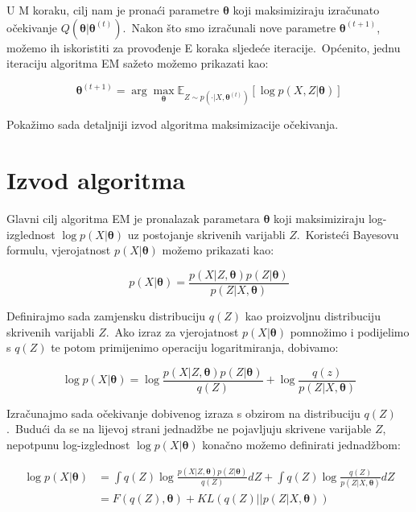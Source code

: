 \documentclass[diplomskirad]{fer}
\begin{document}
U M koraku, cilj nam je pronaći parametre $\bm{\theta}$ koji maksimiziraju izračunato očekivanje $Q (\bm{\theta} | \bm{\theta}^{(t)})$.\
Nakon što smo izračunali nove parametre $\bm{\theta}^{(t + 1)}$, možemo ih iskoristiti za provođenje E koraka sljedeće iteracije.\ 
Općenito, jednu iteraciju algoritma EM sažeto možemo prikazati kao:

\begin{equation}
  \bm{\theta}^{(t + 1)} = \arg \max_{\bm{\theta}} \mathbb{E}_{Z \sim p(\cdot | X, \bm{\theta}^{(t)})} \left[ \log p(X, Z | \bm{\theta}) \right]
  \label{eq:em_alg_basic}
\end{equation}

Pokažimo sada detaljniji izvod algoritma maksimizacije očekivanja.\

\section{Izvod algoritma}
\label{sek:izvod_em}

Glavni cilj algoritma EM je pronalazak parametara $\bm{\theta}$ koji maksimiziraju log-izglednost $\log p(X | \bm{\theta})$ uz postojanje skrivenih varijabli $Z$.\ Koristeći Bayesovu formulu, vjerojatnost $p(X | \bm{\theta})$ možemo prikazati kao:

\begin{equation}
  p(X | \bm{\theta}) = \frac{p(X | Z, \bm{\theta}) p(Z | \bm{\theta})}{p(Z | X, \bm{\theta})}
  \label{eq:em_bayes}
\end{equation}

\pagebreak

Definirajmo sada zamjensku distribuciju $q(Z)$ kao proizvoljnu distribuciju skrivenih varijabli $Z$.\ Ako izraz za vjerojatnost $p(X | \bm{\theta})$ pomnožimo i podijelimo s $q(Z)$ te potom primijenimo operaciju logaritmiranja, dobivamo:

\begin{equation}
  \log p(X | \bm{\theta}) = \log \frac{p(X | Z, \bm{\theta}) p(Z | \bm{\theta})}{q(Z)} + \log \frac{q(z)}{p(Z | X, \bm{\theta})}
  \label{eq:em_log}
\end{equation}

Izračunajmo sada očekivanje dobivenog izraza s obzirom na distribuciju $q(Z)$.\ Budući da se na lijevoj strani jednadžbe ne pojavljuju skrivene varijable $Z$, nepotpunu log-izglednost $\log p(X | \bm{\theta})$ konačno možemo definirati jednadžbom:

\begin{equation}
  \begin{aligned}
    \log p(X | \bm{\theta}) &= \int q(Z) \log \frac{p(X | Z, \bm{\theta}) p(Z | \bm{\theta})}{q(Z)} dZ + \int q(Z) \log \frac{q(Z)}{p(Z | X, \bm{\theta})} dZ \\
                            &= F(q(Z), \bm{\theta}) + KL(q(Z) || p(Z | X, \bm{\theta}))
  \end{aligned}
  \label{eq:em_general_form}
\end{equation}
\end{document}
